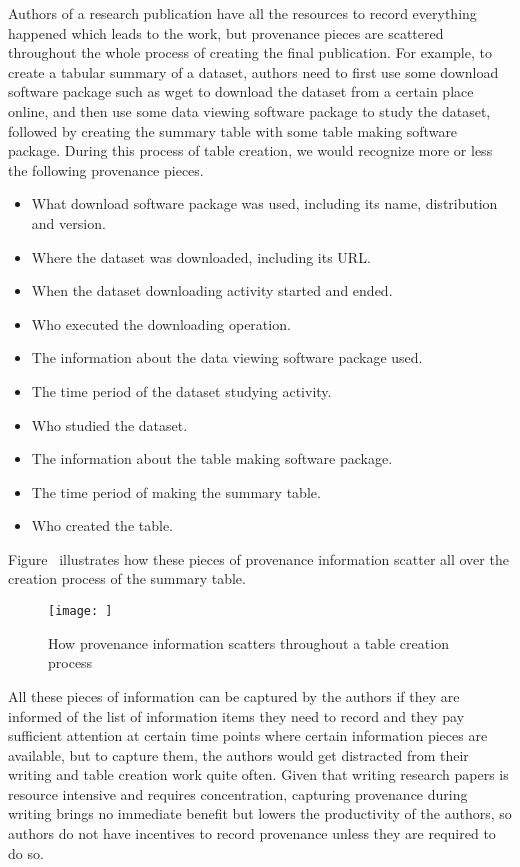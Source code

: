 Authors of a research publication have all the resources to record everything happened which leads to the work, but provenance pieces are scattered throughout the whole process of creating the final publication. For example, to create a tabular summary of a dataset, authors need to first use some download software package such as wget to download the dataset from a certain place online, and then use some data viewing software package to study the dataset, followed by creating the summary table with some table making software package. During this process of table creation, we would recognize more or less the following provenance pieces.
\begin{itemize}
\item What download software package was used, including its name, distribution and version.
\item Where the dataset was downloaded, including its URL.
\item When the dataset downloading activity started and ended.
\item Who executed the downloading operation.
\item The information about the data viewing software package used.
\item The time period of the dataset studying activity.
\item Who studied the dataset.
\item The information about the table making software package.
\item The time period of making the summary table.
\item Who created the table.
\end{itemize}
Figure~\cite{prov-pieces} illustrates how these pieces of provenance information scatter all over the creation process of the summary table.
\begin{figure}
\centering
\texttt{[image: ]}
\caption{How provenance information scatters throughout a table creation process}
\end{figure}
All these pieces of information can be captured by the authors if they are informed of the list of information items they need to record and they pay sufficient attention at certain time points where certain information pieces are available, but to capture them, the authors would get distracted from their writing and table creation work quite often. Given that writing research papers is resource intensive and requires concentration, capturing provenance during writing brings no immediate benefit but lowers the productivity of the authors, so authors do not have incentives to record provenance unless they are required to do so.

